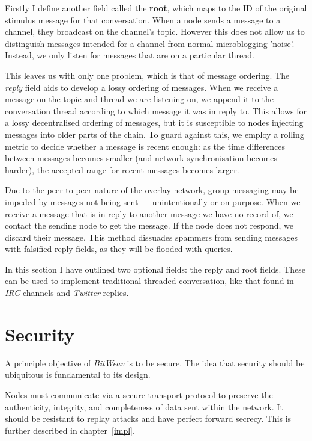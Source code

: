 \documentclass[10pt,a4paper,onecolumn]{article}
\begin{document}
Firstly I define another field called the \textbf{root}, which maps to the ID of the original stimulus message for that conversation. When a node sends a message to a channel, they broadcast on the channel's topic. However this does not allow us to distinguish messages intended for a channel from normal microblogging 'noise'. Instead, we only listen for messages that are on a particular thread. 

This leaves us with only one problem, which is that of message ordering. The \emph{reply} field aids to develop a lossy ordering of messages. When we receive a message on the topic and thread we are listening on, we append it to the conversation thread according to which message it was in reply to. This allows for a lossy decentralised ordering of messages, but it is susceptible to nodes injecting messages into older parts of the chain. To guard against this, we employ a rolling metric to decide whether a message is recent enough: as the time differences between messages becomes smaller (and network synchronisation becomes harder), the accepted range for recent messages becomes larger. 

Due to the peer-to-peer nature of the overlay network, group messaging may be impeded by messages not being sent — unintentionally or on purpose. When we receive a message that is in reply to another message we have no record of, we contact the sending node to get the message. If the node does not respond, we discard their message. This method dissuades spammers from sending messages with falsified reply fields, as they will be flooded with queries. 

In this section I have outlined two optional fields: the reply and root fields. These  can be used to implement traditional threaded conversation, like that found in \textit{IRC} channels and \textit{Twitter} replies.

\section{Security}
\label{security}
A principle objective of \textit{BitWeav} is to be secure. The idea that security should be ubiquitous is fundamental to its design.

Nodes must communicate via a secure transport protocol to preserve the authenticity, integrity, and completeness of data sent within the network. It should be resistant to replay attacks and have perfect forward secrecy. This is further described in chapter~\ref{impl}.
\end{document}
